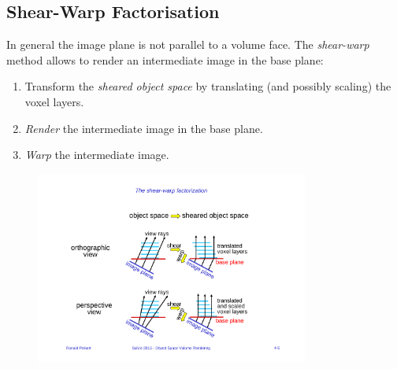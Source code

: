 \subsection{Shear-Warp Factorisation}
In general the image plane is not parallel to a volume face. The \emph{shear-warp} method allows to render an intermediate image in the base plane:
\begin{enumerate}
    \item Transform the \emph{sheared object space} by translating (and possibly scaling) the voxel layers.
    \item \emph{Render} the intermediate image in the base plane.
    \item \emph{Warp} the intermediate image.
\end{enumerate}
\begin{figure}[H]
    \centering
    \includegraphics[width=0.8\textwidth]{img/04_shear_warp_overview}
\end{figure}

